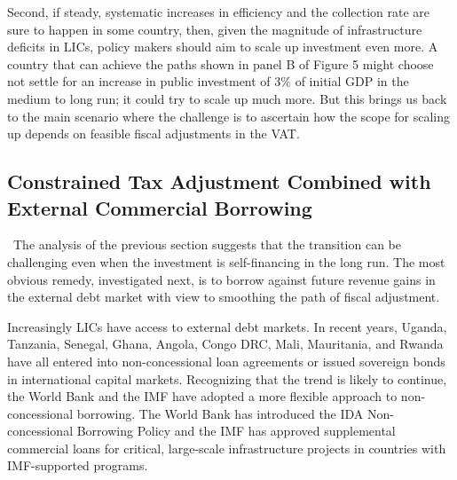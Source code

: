 \documentclass[11pt]{article}
\begin{document}
Second, if steady, systematic increases in efficiency and the collection
rate are sure to happen in some country, then, given the magnitude of
infrastructure deficits in LICs, policy makers should aim to scale up
investment even more. A country that can achieve the paths shown in panel B
of Figure 5 might choose not settle for an increase in public investment of $%
3\%$ of initial GDP in the medium to long run; it could try to scale up much
more. But this brings us back to the main scenario where the challenge is to
ascertain how the scope for scaling up depends on feasible fiscal
adjustments in the VAT.

\subsection{Constrained Tax Adjustment Combined with External Commercial
Borrowing}

\quad\ \thinspace The analysis of the previous section suggests that the
transition can be challenging even when the investment is self-financing in
the long run. The most obvious remedy, investigated next, is to borrow
against future revenue gains in the external debt market with view to
smoothing the path of fiscal adjustment.

Increasingly LICs have access to external debt markets. In recent years,
Uganda, Tanzania, Senegal, Ghana, Angola, Congo DRC, Mali, Mauritania, and
Rwanda have all entered into non-concessional loan agreements or issued
sovereign bonds in international capital markets. Recognizing that the trend
is likely to continue, the World Bank and the IMF have adopted a more
flexible approach to non-concessional borrowing. The World Bank has
introduced the IDA Non-concessional Borrowing Policy and the IMF has
approved supplemental commercial loans for critical, large-scale
infrastructure projects in countries with IMF-supported programs.
\end{document}
